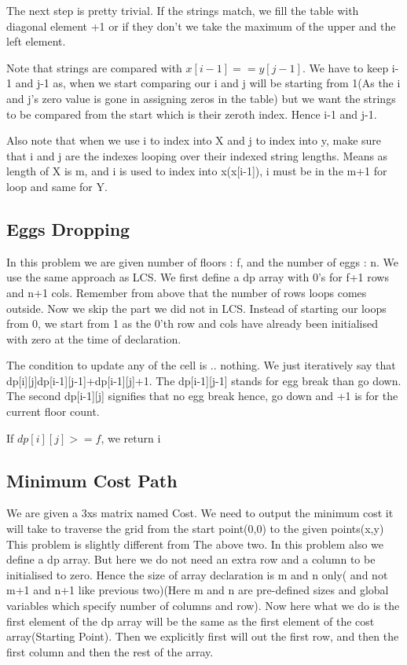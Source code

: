 \documentclass{article}
\newcommand{\nd}{\noindent}
\begin{document}
\nd The next step is pretty trivial. If the strings match, we fill the table with diagonal element +1 or if they don't we take the maximum of the upper and the left element. 

\nd Note that strings are compared with $x[i-1]==y[j-1]$. We have to keep i-1 and j-1 as, when we start comparing our i and j will be starting from 1(As the i and j's zero value is gone in assigning zeros in the table) but we want the strings to be compared from the start which is their zeroth index. Hence i-1 and j-1. 

\nd Also note that when we use i to index into X and j to index into y, make sure that i and j are the indexes looping over their indexed string lengths. Means as length of X is m, and i is used to index into x(x[i-1]), i must be in the m+1 for loop and same for Y.

\subsection{Eggs Dropping} 
In this problem we are given number of floors : f, and the number of eggs : n. We use the same approach as LCS. We first define a dp array with 0's for f+1 rows and n+1 cols. Remember from above that the number of rows loops comes outside. Now we skip the part we did not in LCS. Instead of starting our loops from 0, we start from 1 as the 0'th row and cols have already been initialised with zero at the time of declaration. 

\nd The condition to update any of the cell is .. nothing. We just iteratively say that dp[i][j]dp[i-1][j-1]+dp[i-1][j]+1. The dp[i-1][j-1] stands for egg break than go down. The second dp[i-1][j] signifies that no egg break hence, go down and +1 is for the current floor count. 

\nd If $dp[i][j]>=f$, we return i 

\subsection{Minimum Cost Path} 
We are given a 3xs matrix named Cost. We need to output the minimum cost it will take to traverse the grid from the start point(0,0) to the given points(x,y)
This problem is slightly different from The above two. In this problem also we define a dp array. But here we do not need an extra row and a column to be initialised to zero. Hence the size of array declaration is m and n only( and not m+1 and n+1 like previous two)(Here m and n are pre-defined sizes and global variables which specify number of columns and row). Now here what we do is the first element of the dp array will be the same as the first element of the cost array(Starting Point). Then we explicitly first will out the first row, and then the first column and then the rest of the array. 
\end{document}
